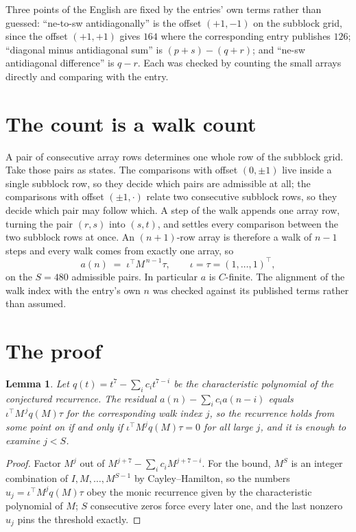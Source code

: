\documentclass[11pt,a4paper]{article}
\theoremstyle{plain}
\newtheorem{lemma}[theorem]{Lemma}
\theoremstyle{definition}
\begin{document}
Three points of the English are fixed by the entries' own terms rather than guessed:
``ne-to-sw antidiagonally'' is the offset $(+1,-1)$ on the subblock grid, since the offset
$(+1,+1)$ gives $164$ where the corresponding entry publishes $126$; ``diagonal minus
antidiagonal sum'' is $(p+s)-(q+r)$; and ``ne-sw antidiagonal difference'' is $q-r$. Each was
checked by counting the small arrays directly and comparing with the entry.

\section{The count is a walk count}

A pair of consecutive array rows determines one whole row of the subblock grid. Take those
pairs as states. The comparisons with offset $(0,\pm1)$ live inside a single subblock row, so
they decide which pairs are admissible at all; the comparisons with offset $(\pm1,\cdot)$
relate two consecutive subblock rows, so they decide which pair may follow which. A step of the
walk appends one array row, turning the pair $(r,s)$ into $(s,t)$, and settles every comparison
between the two subblock rows at once. An $(n+1)$-row array is therefore a walk of $n-1$ steps
and every walk comes from exactly one array, so
\[
a(n)\;=\;\iota^{\!\top}M^{\,n-1}\tau,\qquad \iota=\tau=(1,\dots,1)^{\!\top},
\]
on the $S=480$ admissible pairs. In particular $a$ is $C$-finite. The alignment of the walk
index with the entry's own $n$ was checked against its published terms rather than assumed.

\section{The proof}

\begin{lemma}\label{lem:crit}
Let $q(t)=t^{7}-\sum_i c_it^{7-i}$ be the characteristic polynomial of the
conjectured recurrence. The residual $a(n)-\sum_ic_ia(n-i)$ equals
$\iota^{\!\top}M^{\,j}q(M)\tau$ for the corresponding walk index $j$, so the recurrence
holds from some point on if and only if $\iota^{\!\top}M^{j}q(M)\tau=0$ for all large $j$,
and it is enough to examine $j<S$.
\end{lemma}

\begin{proof}
Factor $M^{j}$ out of $M^{j+7}-\sum_ic_iM^{j+7-i}$. For the bound, $M^{S}$
is an integer combination of $I,M,\dots,M^{S-1}$ by Cayley--Hamilton, so the numbers
$u_j=\iota^{\!\top}M^{j}q(M)\tau$ obey the monic recurrence given by the characteristic
polynomial of $M$; $S$ consecutive zeros force every later one, and the last nonzero $u_j$
pins the threshold exactly.
\end{proof}
\end{document}
